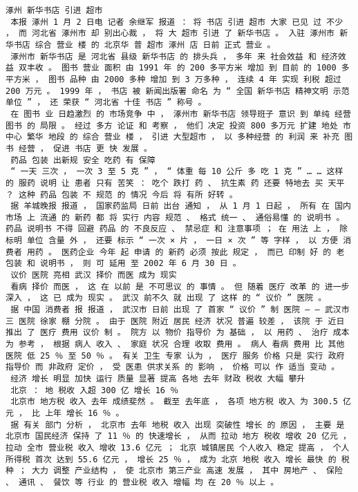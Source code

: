 \documentclass{article}
\begin{document}
\begin{Verbatim}[commandchars=\\\{\}]
 涿州 新华书店 引进 超市 
 本报 涿州 1 月 2 日电 记者 余继军 报道 ： 将 书店 引进 超市 大家 已见 过 不少 ， 而 河北省 涿州市 却 别出心裁 ， 将 大 超市 引进 了 新华书店 。 入驻 涿州市 新华书店 综合 营业 楼 的 北京华 普 超市 涿州 店 日前 正式 营业 。 
 涿州市 新华书店 是 河北省 县级 新华书店 的 排头兵 ， 多年 来 社会效益 和 经济效益 双丰收 。 图书 营业 面积 由 1991 年 的 200 多平方米 增加 到 目前 的 1000 多平方米 ， 图书 品种 由 2000 多种 增加 到 3 万多种 ， 连续 4 年 实现 利税 超过 200 万元 。 1999 年 ， 书店 被 新闻出版署 命名 为 “ 全国 新华书店 精神文明 示范 单位 ” ， 还 荣获 “ 河北省 十佳 书店 ” 称号 。 
 在 图书 业 日趋激烈 的 市场竞争 中 ， 涿州市 新华书店 领导班子 意识 到 单纯 经营 图书 的 局限 。 经过 多方 论证 和 考察 ， 他们 决定 投资 800 多万元 扩建 地处 市中心 繁华 地段 的 综合 营业 楼 ， 引进 大型超市 ， 以 多种经营 的 利润 来 补充 图书 经营 ， 促进 书店 更 快 发展 。 
 药品 包装 出新规 安全 吃药 有 保障 
 “ 一天 三次 ， 一次 3 至 5 克 ” ， “ 体重 每 10 公斤 多 吃 1 克 ” … … 这样 的 服药 说明 让 患者 只有 苦笑 ： 吃个 跌打 药 、 抗生素 药 还要 特地去 买 天平 ？ 这种 药品 包装 不 规范 的 情况 今后 将 有所 好转 。 
 据 羊城晚报 报道 ， 国家药监局 日前 出台 通知 ， 从 1 月 1 日起 ， 所有 在 国内 市场 上 流通 的 新药 都 将 实行 内容 规范 、 格式 统一 、 通俗易懂 的 说明书 。 药品 说明书 不得 回避 药品 的 不良反应 、 禁忌症 和 注意事项 ； 在 用法 上 ， 除 标明 单位 含量 外 ， 还要 标示 “ 一次 × 片 ， 一日 × 次 ” 等 字样 ， 以 方便 消费者 用药 。 医药企业 今年 起 申请 的 新药 必须 按此 规定 ， 而已 印制 好 的 老 包装 和 说明书 ， 则 可 延用 至 2002 年 6 月 30 日 。 
 议价 医院 亮相 武汉 择价 而医 成为 现实 
 看病 择价 而医 ， 这 在 以前 是 不可思议 的 事情 。 但 随着 医疗 改革 的 进一步 深入 ， 这 已 成为 现实 。 武汉 前不久 就 出现 了 这样 的 “ 议价 ” 医院 。 
 据 中国 消费者 报 报道 ， 武汉市 日前 出现 了 首家 “ 议价 ” 制 医院 — — 武汉市 三 医院 徐家 棚 分院 。 由于 医院 附近 居民 经济 状况 普遍 较差 ， 该院 于 近日 推出 了 医疗 费用 议价 制 。 院方 以 物价 指导价 为 基础 ， 以 用药 、 治疗 成本 为 参考 ， 根据 病人 收入 、 家庭 状况 合理 收取 费用 。 病人 看病 费用 比 其他 医院 低 25 ％ 至 50 ％ 。 有关 卫生 专家 认为 ， 医疗 服务 价格 只是 实行 政府 指导价 而 非政府 定价 ， 受 医患 供求关系 的 影响 ， 价格 可以 作 适当 变动 。 
 经济 增长 明显 加快 运行 质量 显著 提高 各地 去年 财政 税收 大幅 攀升 
 北京 ： 地 税收 入超 300 亿 增长 16 ％ 
 北京市 地方税 收入 去年 成绩斐然 。 截至 去年底 ， 各项 地方税 收入 为 300.5 亿元 ， 比 上年 增长 16 ％ 。 
 据 有关 部门 分析 ， 北京市 去年 地税 收入 出现 突破性 增长 的 原因 ， 主要 是 北京市 国民经济 保持 了 11 ％ 的 快速增长 ， 从而 拉动 地方 税收 增收 20 亿元 ， 拉动 全市 营业税 收入 增收 13.6 亿元 ； 北京 城镇居民 个人收入 稳定 提高 ， 个人所得税 首次 达到 55.6 亿元 ， 增长 25 ％ ， 成为 北京 地税 收入 增长 最快 的 税种 ； 大力 调整 产业结构 ， 使 北京市 第三产业 高速 发展 ， 其中 房地产 、 保险 、 通讯 、 餐饮 等 行业 的 营业税 收入 增幅 均 在 20 ％ 以上 。 

\end{Verbatim}
\end{document}

